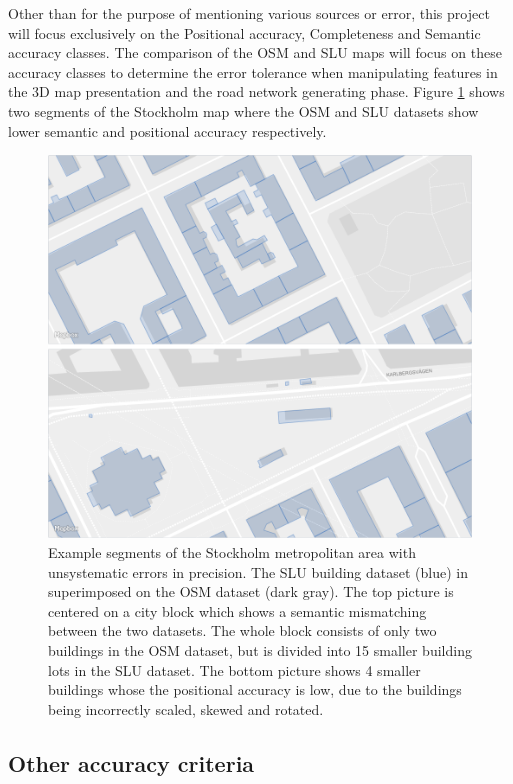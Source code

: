 \documentclass{kththesis}
\begin{document}
Other than for the purpose of mentioning various sources or error, this project will focus exclusively on the Positional accuracy, Completeness and Semantic accuracy classes.
The comparison of the OSM and SLU maps will focus on these accuracy classes to determine the error tolerance when manipulating features in the 3D map presentation and the road network generating phase.
Figure \ref{fig:osm-slu-map} shows two segments of the Stockholm map where the OSM and SLU datasets show lower semantic and positional accuracy respectively.

\begin{figure}[H]
    \centering
    \includegraphics[width=\textwidth,height=0.5\textheight,keepaspectratio]{img_map_compare}
    \caption{Example segments of the Stockholm metropolitan area with unsystematic errors in precision. The SLU building dataset (blue) in superimposed on the OSM dataset (dark gray). The top picture is centered on a city block which shows a semantic mismatching between the two datasets. The whole block consists of only two buildings in the OSM dataset, but is divided into 15 smaller building lots in the SLU dataset. The bottom picture shows 4 smaller buildings whose the positional accuracy is low, due to the buildings being incorrectly scaled, skewed and rotated.}
    \label{fig:osm-slu-map}
\end{figure}

\subsection{Other accuracy criteria}
\end{document}
